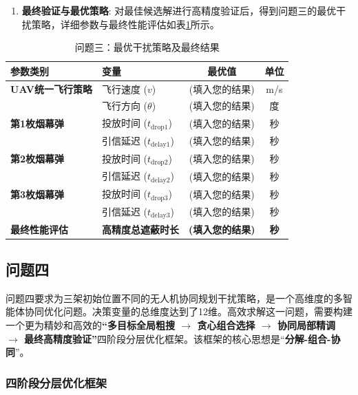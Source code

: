 \documentclass[12pt]{article}
\begin{document}
\begin{CJK}{UTF8}{gbsn}
\begin{enumerate}
			
			\item \textbf{最终验证与最优策略}: 对最佳候选解进行高精度验证后，得到问题三的最优干扰策略，详细参数与最终性能评估如表\ref{tab:results_q3}所示。
		\end{enumerate}
		
		\begin{table}[H]
			\centering
			\caption{问题三：最优干扰策略及最终结果}
			\label{tab:results_q3}
			\begin{tabular}{@{}llcc@{}}
				\toprule
				参数类别           & 变量                & 最优值      & 单位 \\ \midrule
				\textbf{UAV统一飞行策略} & 飞行速度 ($v$)        & (填入您的结果) & m/s  \\
				& 飞行方向 ($\theta$)     & (填入您的结果) & 度   \\ \midrule
				\textbf{第1枚烟幕弹} & 投放时间 ($t_{\text{drop1}}$) & (填入您的结果) & 秒   \\
				& 引信延迟 ($t_{\text{delay1}}$) & (填入您的结果) & 秒   \\ \midrule
				\textbf{第2枚烟幕弹} & 投放时间 ($t_{\text{drop2}}$) & (填入您的结果) & 秒   \\
				& 引信延迟 ($t_{\text{delay2}}$) & (填入您的结果) & 秒   \\ \midrule
				\textbf{第3枚烟幕弹} & 投放时间 ($t_{\text{drop3}}$) & (填入您的结果) & 秒   \\
				& 引信延迟 ($t_{\text{delay3}}$) & (填入您的结果) & 秒   \\ \midrule
				\textbf{最终性能评估} & \textbf{高精度总遮蔽时长} & \textbf{(填入您的结果)} & \textbf{秒}   \\ \bottomrule
			\end{tabular}
		\end{table}
		
		\subsection{问题四}
		
		
		问题四要求为三架初始位置不同的无人机协同规划干扰策略，是一个高维度的多智能体协同优化问题。决策变量的总维度达到了12维。高效求解这一问题，需要构建一个更为精妙和高效的\textbf{“多目标全局粗搜 $\rightarrow$ 贪心组合选择 $\rightarrow$ 协同局部精调 $\rightarrow$ 最终高精度验证”}四阶段分层优化框架。该框架的核心思想是“\textbf{分解-组合-协同}”。
		
		\subsubsection{四阶段分层优化框架}

\end{CJK}
\end{document}
